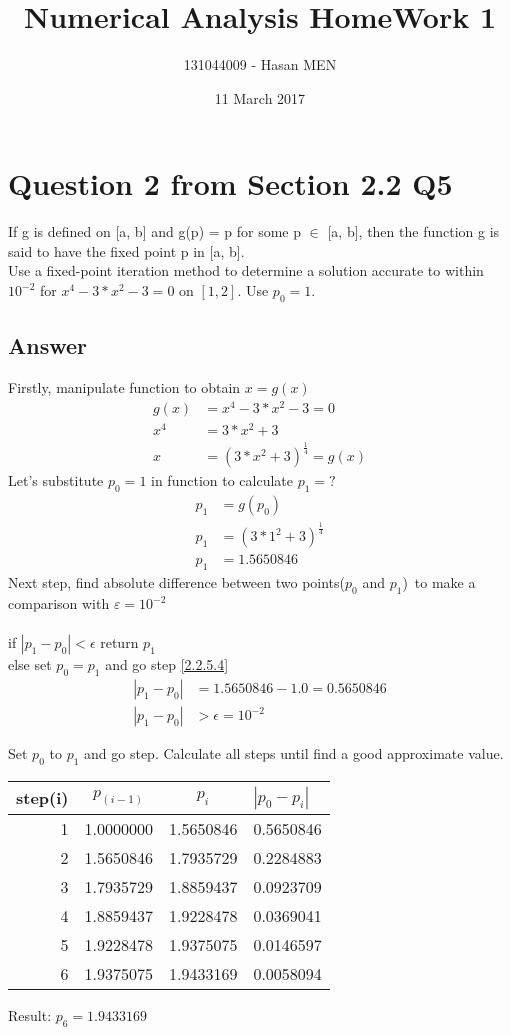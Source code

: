 \documentclass{article}
\title{Numerical Analysis HomeWork 1}
\author{131044009 - Hasan MEN}
\date{11 March 2017}
\begin{document}
\maketitle


\section{Question 2 from Section 2.2 Q5}
If g is defined on [a, b] and g(p) = p for some p $\in$ [a, b], then the function g is said to have the fixed point p in [a, b].\\

Use a fixed-point iteration method to determine a solution accurate to within $10^{-2}$ for $x^4-3*x^2-3 = 0$ on $[1, 2]$. Use $p_0 = 1$.
\subsection{Answer}
Firstly, manipulate function to obtain $x=g(x)$
\begin{align}
\label{2.2.5.1}
g(x) & = x^4-3*x^2-3 = 0\\
\label{2.2.5.2}
x^4 & = 3*x^2+3\\
\label{2.2.5.3}
x & = (3*x^2+3)^ \frac{1}{4}=g(x)
\end{align}
Let's substitute $p_0=1$ in function to calculate $p_1=?$\\
\begin{align}
\label{2.2.5.4}	p_1 & = g(p_0)\\
\label{2.2.5.5}	p_1 & = (3*1^2+3)^ \frac{1}{4}\\
\label{2.2.5.6} p_1 & = 1.5650846
\end{align}
Next step, find absolute difference between two points($p_0$ and $p_1$)\ to make a comparison with $\varepsilon = 10^{-2}$\\\\
if $|p_1-p_0|< \epsilon$ return $p_1$\\
else set $p_0=p_1$ and go step \ref{2.2.5.4}
\begin{align}
\label{2.2.5.7} |p_1-p_0| & = 1.5650846 - 1.0 = 0.5650846 \\
\label{2.2.5.8} |p_1-p_0| & > \epsilon=10^{-2}
\end{align}

Set $p_0$ to $p_1$ and go step. Calculate all steps until find a good approximate value.\\

\begin{tabular}{r|cc|l}
step(i) & $p_(i-1)$ & $p_i$ & $|p_0-p_i|$\\
\hline
1 & 1.0000000 & 1.5650846 & 0.5650846\\
2 & 1.5650846 & 1.7935729 & 0.2284883\\
3 & 1.7935729 & 1.8859437 & 0.0923709\\
4 & 1.8859437 & 1.9228478 & 0.0369041\\
5 & 1.9228478 & 1.9375075 & 0.0146597\\
6 & 1.9375075 & 1.9433169 & 0.0058094\\
\end{tabular}
Result: $p_6= 1.9433169$\\
\end{document}
